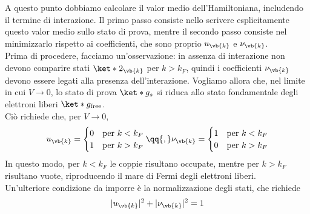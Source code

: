 A questo punto dobbiamo calcolare il valor medio dell'Hamiltoniana, includendo il termine di interazione. Il primo passo consiste nello scrivere esplicitamente questo valor medio sullo stato di prova, mentre il secondo passo consiste nel minimizzarlo rispetto ai coefficienti, che sono proprio $u_{\vb{k}}$ e $\nu_{\vb{k}}$.\\
Prima di procedere, facciamo un'osservazione: in assenza di interazione non devono comparire stati $\ket*{2_{\vb{k}}}$ per $k > k_F$, quindi i coefficienti $\nu_{\vb{k}}$ devono essere legati alla presenza dell'interazione. Vogliamo allora che, nel limite in cui $V \to 0$, lo stato di prova $\ket*{g_s}$ si riduca allo stato fondamentale degli elettroni liberi $\ket*{g_{\rm free}}$.\\
Ciò richiede che, per $V \to 0$,
\begin{equation*}
   u_{\vb{k}}
   =
   \begin{cases}
      0 & \text{per }k<k_F\\
      1 & \text{per }k>k_F
   \end{cases}
   \qq{,}
   \nu_{\vb{k}}
   =
   \begin{cases}
      1 & \text{per }k<k_F\\
      0 & \text{per }k>k_F
   \end{cases}
\end{equation*}
In questo modo, per $k<k_F$ le coppie risultano occupate, mentre per $k>k_F$ risultano vuote, riproducendo il mare di Fermi degli elettroni liberi.\\
Un'ulteriore condizione da imporre è la normalizzazione degli stati, che richiede
\begin{equation}
   |u_{\vb{k}}|^2 + |\nu_{\vb{k}}|^2
   =1
   \label{eq:BCS_normalization_condition}
\end{equation}
